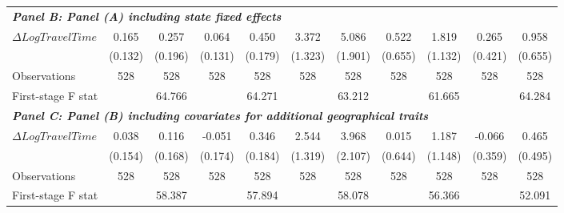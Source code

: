 \begin{table}[p]
{{\begin{tabular}{l*{10}{c}}
\hline
\multicolumn{10}{l}{\linebreak \textbf{\textit{Panel B: Panel (A) including state fixed effects}}} \\
$\Delta Log Travel Time$&       0.165         &       0.257         &       0.064         &       0.450\sym{**} &       3.372\sym{**} &       5.086\sym{**} &       0.522         &       1.819         &       0.265         &       0.958         \\
&     (0.132)         &     (0.196)         &     (0.131)         &     (0.179)         &     (1.323)         &     (1.901)         &     (0.655)         &     (1.132)         &     (0.421)         &     (0.655)         \\
Observations        &         528         &         528         &         528         &         528         &         528         &         528         &         528         &         528         &         528         &         528         \\
First-stage F stat  &                     &      64.766         &                     &      64.271         &                     &      63.212         &                     &      61.665         &                     &      64.284         \\
\hline
\multicolumn{10}{l}{\linebreak \textbf{\textit{Panel C: Panel (B) including covariates for additional geographical traits}}} \\
$\Delta Log Travel Time$&       0.038         &       0.116         &      -0.051         &       0.346\sym{*}  &       2.544\sym{*}  &       3.968\sym{*}  &       0.015         &       1.187         &      -0.066         &       0.465         \\
&     (0.154)         &     (0.168)         &     (0.174)         &     (0.184)         &     (1.319)         &     (2.107)         &     (0.644)         &     (1.148)         &     (0.359)         &     (0.495)         \\
Observations        &         528         &         528         &         528         &         528         &         528         &         528         &         528         &         528         &         528         &         528         \\
First-stage F stat  &                     &      58.387         &                     &      57.894         &                     &      58.078         &                     &      56.366         &                     &      52.091         \\

\end{tabular}}}
\end{table}

